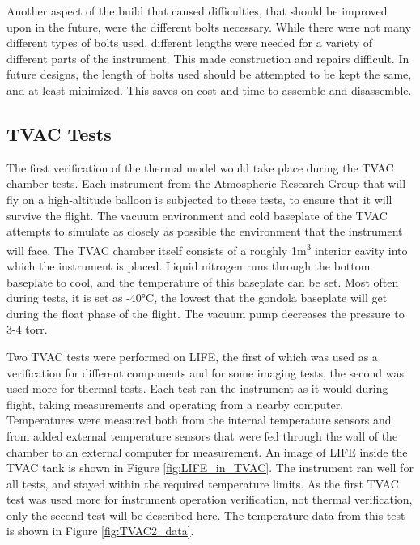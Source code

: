 Another aspect of the build that caused difficulties, that should be improved upon in the future, were the different bolts necessary. While there were not many different types of bolts used, different lengths were needed for a variety of different parts of the instrument. This made construction and repairs difficult. In future designs, the length of bolts used should be attempted to be kept the same, and at least minimized. This saves on cost and time to assemble and disassemble.

\subsection{TVAC Tests}\label{TVAC_tests}
The first verification of the thermal model would take place during the TVAC chamber tests. Each instrument from the Atmospheric Research Group that will fly on a high-altitude balloon is subjected to these tests, to ensure that it will survive the flight. The vacuum environment and cold baseplate of the TVAC attempts to simulate as closely as possible the environment that the instrument will face. The TVAC chamber itself consists of a roughly 1m\textsuperscript{3} interior cavity into which the instrument is placed. Liquid nitrogen runs through the bottom baseplate to cool, and the temperature of this baseplate can be set. Most often during tests, it is set as -40°C, the lowest that the gondola baseplate will get during the float phase of the flight. The vacuum pump decreases the pressure to 3-4 torr.

Two TVAC tests were performed on LIFE, the first of which was used as a verification for different components and for some imaging tests, the second was used more for thermal tests. Each test ran the instrument as it would during flight, taking measurements and operating from a nearby computer. Temperatures were measured both from the internal temperature sensors and from added external temperature sensors that were fed through the wall of the chamber to an external computer for measurement. An image of LIFE inside the TVAC tank is shown in Figure \ref{fig:LIFE_in_TVAC}. The instrument ran well for all tests, and stayed within the required temperature limits. As the first TVAC test was used more for instrument operation verification, not thermal verification, only the second test will be described here. The temperature data from this test is shown in Figure \ref{fig:TVAC2_data}.

